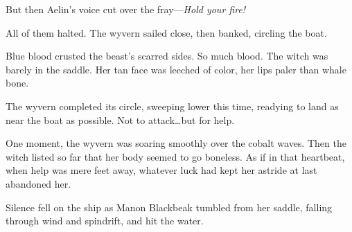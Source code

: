 But then Aelin's voice cut over the fray---\emph{Hold your fire!}

All of them halted.
The wyvern sailed close, then banked, circling the boat.

Blue blood crusted the beast's scarred sides.
So much blood.
The witch was barely in the saddle.
Her tan face was leeched of color, her lips paler than whale bone.

The wyvern completed its circle, sweeping lower this time, readying to land as near the boat as possible.
Not to attack\ldots but for help.

One moment, the wyvern was soaring smoothly over the cobalt waves.
Then the witch listed so far that her body seemed to go boneless.
As if in that heartbeat, when help was mere feet away, whatever luck had kept her astride at last abandoned her.

Silence fell on the ship as Manon Blackbeak tumbled from her saddle, falling through wind and spindrift, and hit the water.
